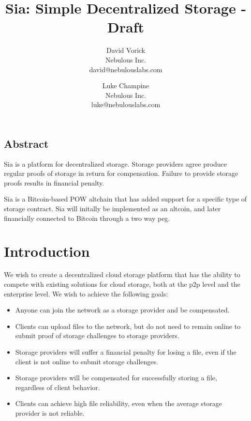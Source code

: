\documentclass[twocolumn]{article}
\begin{document}
\frenchspacing

\title{Sia: Simple Decentralized Storage - Draft}

\author{
{\rm David Vorick}\\
Nebulous Inc.\\
david@nebulouslabs.com
\and
{\rm Luke Champine}\\
Nebulous Inc.\\
luke@nebulouslabs.com
}

\maketitle

\subsection*{Abstract}
Sia is a platform for decentralized storage.
Storage providers agree produce regular proofs of storage in return for compensation.
Failure to provide storage proofs results in financial penalty.

Sia is a Bitcoin-based POW altchain that has added support for a specific type of storage contract.
Sia will initally be implemented as an altcoin, and later financially connected to Bitcoin through a two way peg.

\section{Introduction}
We wish to create a decentralized cloud storage platform that has the ability to compete with existing solutions for cloud storage, both at the p2p level and the enterprise level.
We wish to achieve the following goals:
\begin{itemize}
	\item Anyone can join the network as a storage provider and be compensated.
	\item Clients can upload files to the network, but do not need to remain online to submit proof of storage challenges to storage providers.
	\item Storage providers will suffer a financial penalty for losing a file, even if the client is not online to submit storage challenges.
	\item Storage providers will be compensated for successfully storing a file, regardless of client behavior.
	\item Clients can achieve high file reliability, even when the average storage provider is not reliable.
\end{itemize}
\end{document}
